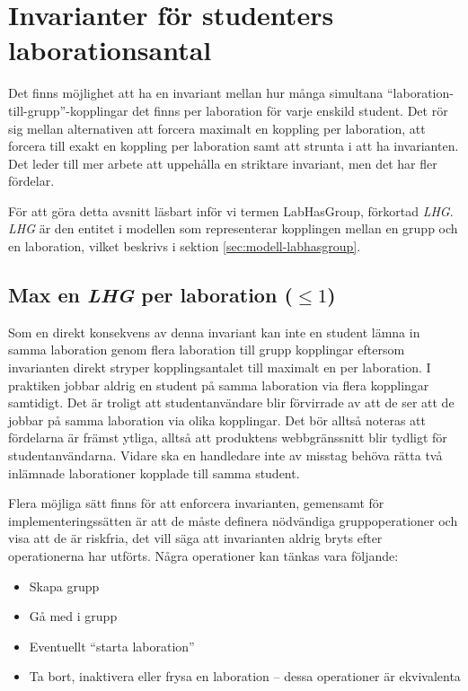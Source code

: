 \section{Invarianter för studenters laborationsantal}

Det finns möjlighet att ha en invariant mellan hur många simultana “laboration-till-grupp”-kopplingar det finns per laboration för varje enskild student. Det rör sig mellan alternativen att forcera maximalt en koppling per laboration, att forcera till exakt en koppling per laboration samt att strunta i att ha invarianten. Det leder till mer arbete att uppehålla en striktare invariant, men det har fler fördelar.

För att göra detta avsnitt läsbart inför vi termen LabHasGroup, förkortad \emph{LHG}. \emph{LHG} är den entitet i modellen som representerar kopplingen mellan en grupp och en laboration, vilket beskrivs i sektion \ref{sec:modell-labhasgroup}. 

\subsection{Max en \emph{LHG} per laboration ($\leq 1$)}
Som en direkt konsekvens av denna invariant kan inte en student lämna in samma laboration genom flera laboration till grupp kopplingar eftersom invarianten direkt stryper kopplingsantalet till maximalt en per laboration. I praktiken jobbar aldrig en student på samma laboration via flera kopplingar samtidigt. Det är troligt att studentanvändare blir förvirrade av att de ser att de jobbar på samma laboration via olika kopplingar. Det bör alltså noteras att fördelarna är främst  ytliga, alltså att produktens webbgränssnitt blir tydligt för studentanvändarna. Vidare ska en handledare inte av misstag behöva rätta två inlämnade laborationer kopplade till samma student.

Flera möjliga sätt finns för att enforcera invarianten, gemensamt för implementeringssätten är att de måste definera nödvändiga gruppoperationer och visa att de är riskfria, det vill säga att invarianten aldrig bryts efter operationerna har utförts. Några operationer kan tänkas vara följande:

\begin{itemize}
  \item Skapa grupp
  \item Gå med i grupp
  \item Eventuellt “starta laboration”
  \item Ta bort,  inaktivera eller frysa en laboration – dessa operationer är ekvivalenta
\end{itemize} 

